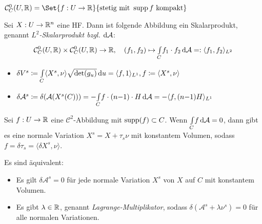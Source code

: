 \documentclass{cheat-sheet}
\newcommand{\A}{\mathcal{A}} %
\begin{document}
\begin{nota}
  $\mathcal{C}^0_C(U, \R) = \Set{ f : U \to \R }{ \text{stetig mit } \supp f \text{ kompakt} }$
\end{nota}

\iffalse
  $V = \mathcal{C}^0(C, \R) = \Set{ f : C \to \R }{ \text{stetig} }$

  Skalarprodukt:
  \begin{align*}
    \mathcal{C}^0(C, \R) \times \mathcal{C}^0(C, \R) &\to \R
    (f_1, f_2) &\mapsto \Int{C}{}{f_1 \cdot f_2}{\A} =: \langle f_1 , f_2 \rangle_{L^2}
  \end{align*}
\fi

\begin{defn}
  Sei $X : U \to \mathbb{R}^n$ eine HF. Dann ist folgende Abbildung ein Skalarprodukt, genannt \emph{$L^2$-Skalarprodukt bzgl. $\d \A$}:
  \[
    \mathcal{C}^0_C(U, \R) \times \mathcal{C}^0_C(U, \R) \to \R, \quad
    (f_1, f_2) \mapsto \Int{C}{}{f_1 \cdot f_2}{\A} =: \langle f_1 , f_2 \rangle_{L^2}
  \]
\end{defn}

\begin{nota}
  \begin{itemize}
    \item $\delta V^s \coloneqq {\textstyle \int\limits_{C}^{}} \langle X^s , \nu \rangle \sqrt{\det(g_u)} \,\mathrm{d} u = \langle f , 1 \rangle_{L^1}, f \coloneqq \langle X^s , \nu \rangle$
    \item $\delta \A^s \coloneqq \delta(\A(X^s(C))) = - \Int{C}{}{f \cdot (n{-}1) \cdot H}{\A} = - \langle f, (n{-}1) H \rangle_{L^1}$
  \end{itemize}
\end{nota}




\begin{lem}
  Sei $f : U \to \mathbb{R}$ eine $\mathcal{C}^2$-Abbildung mit $\mathop{\mathrm{supp}}(f) \subset C$. Wenn $\Int{C}{}{f}{\A} = 0$, dann gibt es eine normale Variation $X^s = X + \tau_s \nu$ mit konstantem Volumen, sodass $f = \delta \tau_s = \langle \delta X^s , \nu \rangle$.
\end{lem}

\begin{prop}
  Es sind äquivalent:
  \begin{itemize}
    \item Es gilt $\delta \A^s = 0$ für jede normale Variation $X^s$ von $X$ auf $C$ mit konstantem Volumen.
    \item Es gibt $\lambda \in \mathbb{R}$, genannt \emph{Lagrange-Multiplikator}, sodass $\delta(\A^s + \lambda \nu^s) = 0$ für alle normalen Variationen.
  \end{itemize}
\end{prop}
\end{document}
